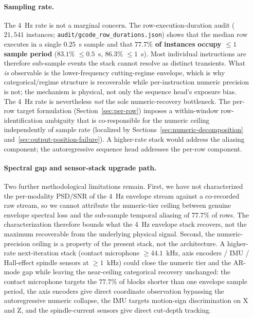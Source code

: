 \documentclass[sensors,article,submit,moreauthors,pdftex]{Definitions/mdpi}
\begin{document}
\paragraph{Sampling rate.} The 4~Hz rate is not a marginal concern. The row-execution-duration audit ($21{,}541$ instances; \texttt{audit/gcode\_row\_durations.json}) shows that the median row executes in a single $0.25$~s sample and that \textbf{$77.7\%$ of instances occupy $\le\!1$ sample period} ($83.1\%$ $\le\!0.5$~s, $86.3\%$ $\le\!1$~s). Most individual instructions are therefore sub-sample events the stack cannot resolve as distinct transients. What \emph{is} observable is the lower-frequency cutting-regime envelope, which is why categorical/regime structure is recoverable while per-instruction numeric precision is not; the mechanism is physical, not only the sequence head's exposure bias. The 4~Hz rate is nevertheless \emph{not} the sole numeric-recovery bottleneck. The per-row target formulation (Section~\ref{sec:per-row}) imposes a within-window row-identification ambiguity that is co-responsible for the numeric ceiling independently of sample rate (localized by Sections~\ref{sec:numeric-decomposition} and~\ref{sec:output-position-failure}). A higher-rate stack would address the aliasing component; the autoregressive sequence head addresses the per-row component.

\paragraph{Spectral gap and sensor-stack upgrade path.} Two further methodological limitations remain. First, we have not characterized the per-modality PSD/SNR of the 4~Hz envelope stream against a co-recorded raw stream, so we cannot attribute the numeric-tier ceiling between genuine envelope spectral loss and the sub-sample temporal aliasing of $77.7\%$ of rows. The characterization therefore bounds what the 4~Hz envelope stack recovers, not the maximum recoverable from the underlying physical signal. Second, the numeric-precision ceiling is a property of the present stack, not the architecture. A higher-rate next-iteration stack (contact microphone $\geq 44.1$~kHz, axis encoders / IMU / Hall-effect spindle sensors at $\geq 1$~kHz) could close the numeric tier and the AR-mode gap while leaving the near-ceiling categorical recovery unchanged: the contact microphone targets the $77.7\%$ of blocks shorter than one envelope sample period, the axis encoders give direct coordinate observation bypassing the autoregressive numeric collapse, the IMU targets motion-sign discrimination on X and Z, and the spindle-current sensors give direct cut-depth tracking.
\end{document}
